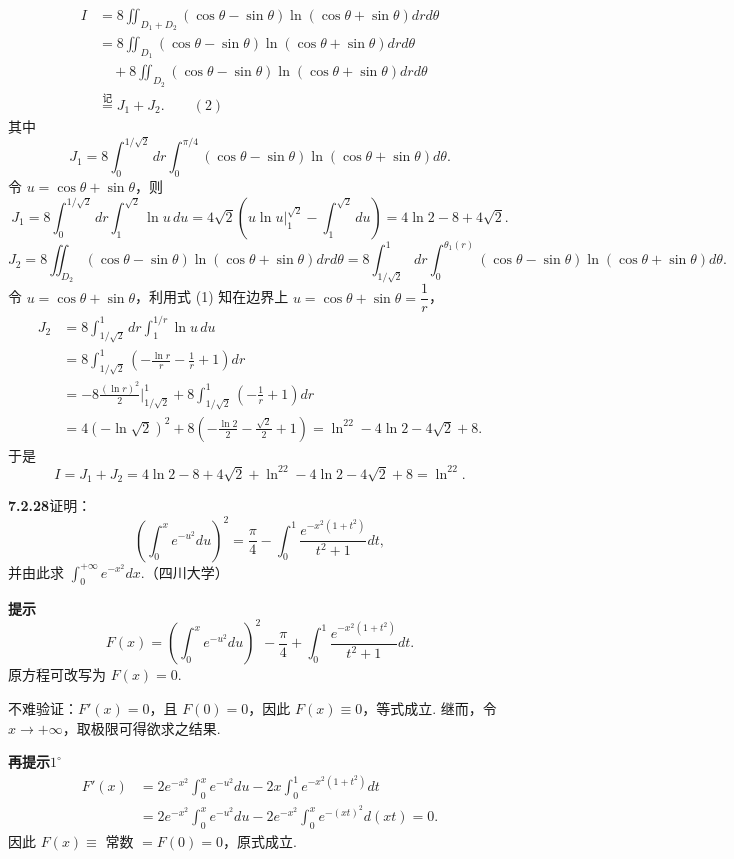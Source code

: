 \documentclass[UTF8,12pt,a4paper,fontset=fandol]{ctexart}
\begin{document}
\[
\begin{aligned}
I&=8\iint_{D_1+D_2}(\cos\theta-\sin\theta)\ln(\cos\theta+\sin\theta)drd\theta\\
&=8\iint_{D_1}(\cos\theta-\sin\theta)\ln(\cos\theta+\sin\theta)drd\theta\\
&\quad+8\iint_{D_2}(\cos\theta-\sin\theta)\ln(\cos\theta+\sin\theta)drd\theta\\
&\overset{\text{记}}=J_1+J_2. \qquad (2)
\end{aligned}
\]
其中
\[
J_1=8\int_0^{1/\sqrt2}dr\int_0^{\pi/4}
(\cos\theta-\sin\theta)\ln(\cos\theta+\sin\theta)d\theta.
\]
令 $u=\cos\theta+\sin\theta$，则
\[
J_1=8\int_0^{1/\sqrt2}dr\int_1^{\sqrt2}\ln u\,du
=4\sqrt2\left(u\ln u\Big|_1^{\sqrt2}-\int_1^{\sqrt2}du\right)
=4\ln2-8+4\sqrt2.
\]
\[
J_2=8\iint_{D_2}(\cos\theta-\sin\theta)\ln(\cos\theta+\sin\theta)drd\theta
=8\int_{1/\sqrt2}^1dr\int_0^{\theta_1(r)}
(\cos\theta-\sin\theta)\ln(\cos\theta+\sin\theta)d\theta.
\]
令 $u=\cos\theta+\sin\theta$，利用式 (1) 知在边界上 $u=\cos\theta+\sin\theta=\dfrac1r$，
\[
\begin{aligned}
J_2&=8\int_{1/\sqrt2}^1dr\int_1^{1/r}\ln u\,du\\
&=8\int_{1/\sqrt2}^1\left(-\frac{\ln r}{r}-\frac1r+1\right)dr\\
&=-8\frac{(\ln r)^2}{2}\Big|_{1/\sqrt2}^1
+8\int_{1/\sqrt2}^1\left(-\frac1r+1\right)dr\\
&=4(-\ln\sqrt2)^2+8\left(-\frac{\ln2}{2}-\frac{\sqrt2}{2}+1\right)
=\ln^22-4\ln2-4\sqrt2+8.
\end{aligned}
\]
于是
\[
I=J_1+J_2
=4\ln2-8+4\sqrt2+\ln^22-4\ln2-4\sqrt2+8
=\ln^22.
\]

\noindent\textbf{7.2.28}\quad 证明：
\[
\left(\int_0^xe^{-u^2}du\right)^2
=\frac\pi4-\int_0^1\frac{e^{-x^2(1+t^2)}}{t^2+1}dt,
\]
并由此求 $\displaystyle\int_0^{+\infty}e^{-x^2}dx$.（四川大学）

\noindent\textbf{提示}\quad
\[
F(x)=\left(\int_0^xe^{-u^2}du\right)^2-\frac\pi4
+\int_0^1\frac{e^{-x^2(1+t^2)}}{t^2+1}dt.
\]
原方程可改写为 $F(x)=0$.

不难验证：$F'(x)=0$，且 $F(0)=0$，因此 $F(x)\equiv0$，等式成立. 继而，令 $x\to+\infty$，取极限可得欲求之结果.

\noindent\textbf{再提示}\quad $1^\circ$
\[
\begin{aligned}
F'(x)
&=2e^{-x^2}\int_0^xe^{-u^2}du
-2x\int_0^1e^{-x^2(1+t^2)}dt\\
&=2e^{-x^2}\int_0^xe^{-u^2}du
-2e^{-x^2}\int_0^xe^{-(xt)^2}d(xt)=0.
\end{aligned}
\]
因此 $F(x)\equiv$ 常数 $=F(0)=0$，原式成立.
\end{document}
